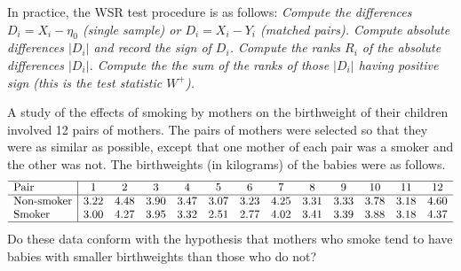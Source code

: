In practice, the WSR test procedure is as follows:
\ben
\it Compute the differences $D_i = X_i - \eta_0$ (single sample) or $D_i=X_i-Y_i$ (matched pairs).
\it Compute absolute differences $|D_i|$ and record the sign of $D_i$.
\it Compute the ranks $R_i$ of the absolute differences $|D_i|$.
\it Compute the the sum of the ranks of those $|D_i|$ having positive sign (this is the test statistic $W^{+}$).
\een

\begin{example}
A study of the effects of smoking by mothers on the birthweight of their children involved 12 pairs of mothers. The pairs of mothers were selected so that they were as similar as possible, except that one mother of each pair was a smoker and the other was not. The birthweights (in kilograms) of the babies were as follows.
\[\begin{array}{l|cccccccccccc} \hline
\text{Pair}			& 1      &  2     & 3      & 4      & 5      & 6      & 7      & 8      & 9      & 10     & 11     & 12 		\\ \hline
\text{Non-smoker}	& 3.22   & 4.48   & 3.90   & 3.47   & 3.07   & 3.23   & 4.25   & 3.31   & 3.33   & 3.78   & 3.18   & 4.60  	\\ 
\text{Smoker}		& 3.00   & 4.27   & 3.95   & 3.32   & 2.51   & 2.77   & 4.02   & 3.41   & 3.39   & 3.88   & 3.18   & 4.37 	\\ \hline
\end{array}\]
Do these data conform with the hypothesis that mothers who smoke tend to have babies with smaller birthweights than those who do not? 
\end{example}

